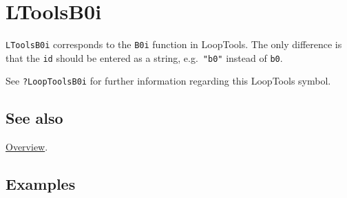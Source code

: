 \documentclass[../FeynHelpersManual.tex]{subfiles}
\begin{document}
\hypertarget{ltoolsb0i}{
\section{LToolsB0i}\label{ltoolsb0i}}

\texttt{LToolsB0i} corresponds to the \texttt{B0i} function in
LoopTools. The only difference is that the \texttt{id} should be entered
as a string, e.g.~\texttt{"b0"} instead of \texttt{b0}.

See \texttt{?LoopTools\textasciigrave B0i} for further information
regarding this LoopTools symbol.

\subsection{See also}

\hyperlink{toc}{Overview}.

\subsection{Examples}
\end{document}
